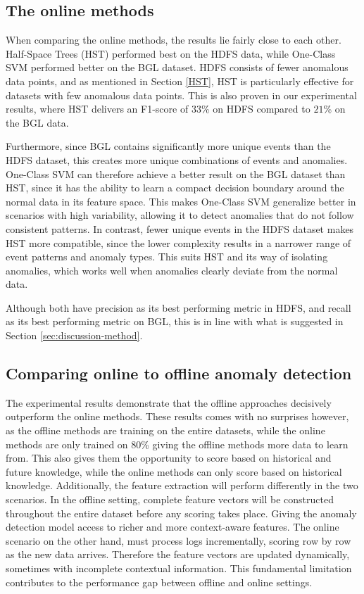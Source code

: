 \subsection{The online methods}
When comparing the online methods, the results lie fairly close to each other. Half-Space Trees (HST) performed best on the HDFS data, while One-Class SVM performed better on the BGL dataset. HDFS consists of fewer anomalous data points, and as mentioned in Section \ref{HST}, HST is particularly effective for datasets with few anomalous data points. This is also proven in our experimental results, where HST delivers an F1-score of $33$\% on HDFS compared to $21$\% on the BGL data. 

Furthermore, since BGL contains significantly more unique events than the HDFS dataset, this creates more unique combinations of events and anomalies. One-Class SVM can therefore achieve a better result on the BGL dataset than HST, since it has the ability to learn a compact decision boundary around the normal data in its feature space.  This makes  One-Class SVM generalize better in scenarios with high variability, allowing it to detect anomalies that do not follow consistent patterns. In contrast, fewer unique events in the HDFS dataset makes HST more compatible, since the lower complexity results in a narrower range of event patterns and anomaly types. This suits HST and its way of isolating anomalies, which works well when anomalies clearly deviate from the normal data.

Although both have precision as its best performing metric in HDFS, and recall as its best performing metric on BGL, this is in line with what is suggested in Section \ref{sec:discussion-method}.

\subsection{Comparing online to offline anomaly detection}
The experimental results demonstrate that the offline approaches decisively outperform the online methods. These results comes with no surprises however, as the offline methods are training on the entire datasets, while the online methods are only trained on 80\% giving the offline methods more data to learn from. This also gives them the opportunity to score based on historical and future knowledge, while the online methods can only score based on historical knowledge. Additionally, the feature extraction will perform differently in the two scenarios. In the offline setting, complete feature vectors will be constructed throughout the entire dataset before any scoring takes place. Giving the anomaly detection model access to richer and more context-aware features. The online scenario on the other hand, must process logs incrementally, scoring row by row as the new data arrives. Therefore the feature vectors are updated dynamically, sometimes with incomplete contextual information. This fundamental limitation contributes to the performance gap between offline and online settings. 

